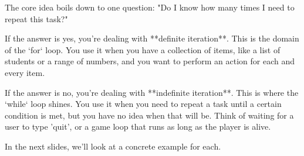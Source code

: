 \documentclass{beamer}
\begin{document}
\begin{frame}[fragile]
\begin{note}
    The core idea boils down to one question: "Do I know how many times I need to repeat this task?"

    If the answer is yes, you're dealing with **definite iteration**. This is the domain of the `for` loop. You use it when you have a collection of items, like a list of students or a range of numbers, and you want to perform an action for each and every item.

    If the answer is no, you're dealing with **indefinite iteration**. This is where the `while` loop shines. You use it when you need to repeat a task until a certain condition is met, but you have no idea when that will be. Think of waiting for a user to type 'quit', or a game loop that runs as long as the player is alive.

    In the next slides, we'll look at a concrete example for each.
    \end{note}
\end{frame}
\end{document}

